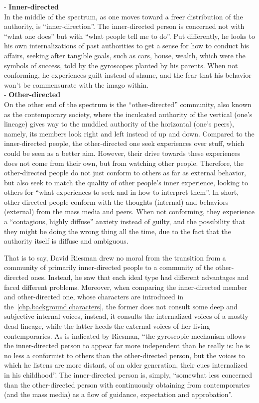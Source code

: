 \noindent - \textbf{Inner-directed}\\ 
In the middle of the spectrum, as one moves toward a freer distribution of the authority, is ``inner-direction''. The inner-directed person is concerned not with ``what one does'' but with ``what people tell me to do''. Put differently, he looks to his own internalizations of past authorities to get a sense for how to conduct his affairs, seeking after tangible goals, such as cars, house, wealth, which were the symbols of success, told by the gyroscopes planted by his parents. When not conforming, he experiences guilt instead of shame, and the fear that his behavior won’t be commensurate with the imago within.\\

\noindent - \textbf{Other-directed}\\
On the other end of the spectrum is the ``other-directed'' community, also known as the contemporary society, where the inculcated authority of the vertical (one’s lineage) gives way to the muddled authority of the horizontal (one’s peers), namely, its members look right and left instead of up and down. Compared to the inner-directed people, the other-directed one seek experiences over stuff, which could be seen as a better aim. However, their drive towards these experiences does not come from their own, but from watching other people. Therefore, the other-directed people do not just conform to others as far as external behavior, but also seek to match the quality of other people’s inner experience, looking to others for ``what experiences to seek and in how to interpret them''. In short, other-directed people conform with the thoughts (internal) and behaviors (external) from the mass media and peers. When not conforming, they experience a ``contagious, highly diffuse'' anxiety instead of guilty, and the possibility that they might be doing the wrong thing all the time, due to the fact that the authority itself is diffuse and ambiguous. 

That is to say, David Riesman drew no moral from the transition from a community of primarily inner-directed people to a community of the other-directed ones. Instead, he saw that each ideal type had different advantages and faced different problems. Moreover, when comparing the inner-directed member and other-directed one, whose characters are introduced in the~\ref{chp.background.characters}, the former does not consult some deep and subjective internal voices, instead, it consults the internalized voices of a mostly dead lineage, while the latter heeds the external voices of her living contemporaries. As is indicated by Riesman, ``the gyroscopic mechanism allows the inner-directed person to appear far more independent than he really is: he is no less a conformist to others than the other-directed person, but the voices to which he listens are more distant, of an older generation, their cues internalized in his childhood''. The inner-directed person is, simply, ``somewhat less concerned than the other-directed person with continuously obtaining from contemporaries (and the mass media) as a flow of guidance, expectation and approbation''. 

